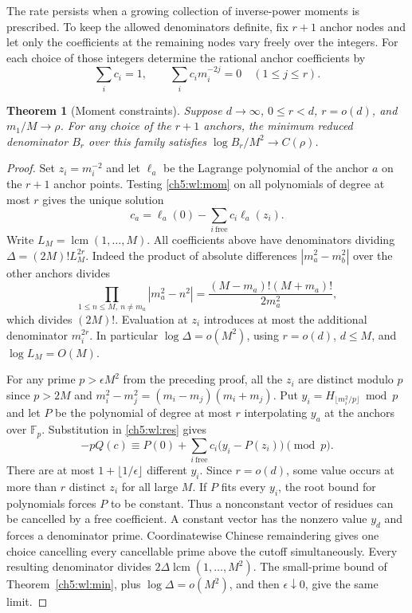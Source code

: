 \documentclass[11pt,a4paper,oneside,openany]{report}
\newtheorem{theorem}{Theorem}[section]
\theoremstyle{remark}\newtheorem{remark}[theorem]{Remark}
\numberwithin{equation}{section}
\begin{document}
The rate persists when a growing collection of inverse-power moments
is prescribed. To keep the allowed denominators definite, fix $r+1$
anchor nodes and let only the coefficients at the remaining nodes vary
freely over the integers. For each choice of those integers determine
the rational anchor coefficients by
\begin{equation}\label{ch5:wl:mom}
     \sum_i c_i=1,\qquad \sum_i c_i m_i^{-2j}=0\quad (1\le j\le r).
\end{equation}

\begin{theorem}[Moment constraints]\label{ch5:wl:moments}
Suppose $d\to\infty$, $0\le r<d$, $r=o(d)$, and $m_1/M\to\rho$.
For any choice of the $r+1$ anchors, the minimum reduced denominator
$B_r$ over this family satisfies $\log B_r/M^2\to C(\rho)$.
\end{theorem}

\begin{proof}
Set $z_i=m_i^{-2}$ and let $\ell_a$ be the Lagrange polynomial of the
anchor $a$ on the $r+1$ anchor points. Testing \eqref{ch5:wl:mom} on all
polynomials of degree at most $r$ gives the unique solution
\[
 c_a=\ell_a(0)-\sum_{i\ \mathrm{free}}c_i\ell_a(z_i).
\]
Write $L_M=\operatorname{lcm}(1,\dots,M)$. All coefficients above
have denominators dividing $\Delta=(2M)!L_M^{2r}$. Indeed the product
of absolute differences $|m_a^2-m_b^2|$ over the other anchors divides
\[
 \prod_{1\le n\le M,\ n\ne m_a}|m_a^2-n^2|
   =\frac{(M-m_a)!(M+m_a)!}{2m_a^2},
\]
which divides $(2M)!$. Evaluation at $z_i$ introduces at most the
additional denominator $m_i^{2r}$. In particular $\log\Delta=o(M^2)$,
using $r=o(d)$, $d\le M$, and $\log L_M=O(M)$.

For any prime $p>\epsilon M^2$ from the preceding proof, all the $z_i$
are distinct modulo $p$ since $p>2M$ and
$m_i^2-m_j^2=(m_i-m_j)(m_i+m_j)$. Put
$y_i=H_{\lfloor m_i^2/p\rfloor}\bmod p$ and let $P$ be the polynomial
of degree at most $r$ interpolating $y_a$ at the anchors over
$\mathbb F_p$. Substitution in \eqref{ch5:wl:res} gives
\[
             -pQ(c)\equiv P(0)+
                 \sum_{i\ \mathrm{free}}c_i\bigl(y_i-P(z_i)\bigr)
                 \pmod p .
\]
There are at most $1+\lfloor1/\epsilon\rfloor$ different $y_i$.
Since $r=o(d)$, some value occurs at more than $r$ distinct $z_i$
for all large $M$. If $P$ fits every $y_i$, the root bound for
polynomials forces $P$ to be constant. Thus a nonconstant vector of
residues can be cancelled by a free coefficient. A constant vector
has the nonzero value $y_d$ and forces a denominator prime. Coordinatewise
Chinese remaindering gives one choice cancelling every cancellable
prime above the cutoff simultaneously. Every resulting denominator
divides $2\Delta\operatorname{lcm}(1,\ldots,M^2)$. The small-prime
bound of Theorem~\ref{ch5:wl:min}, plus $\log\Delta=o(M^2)$, and then
$\epsilon\downarrow0$, give the same limit.
\end{proof}
\end{document}
